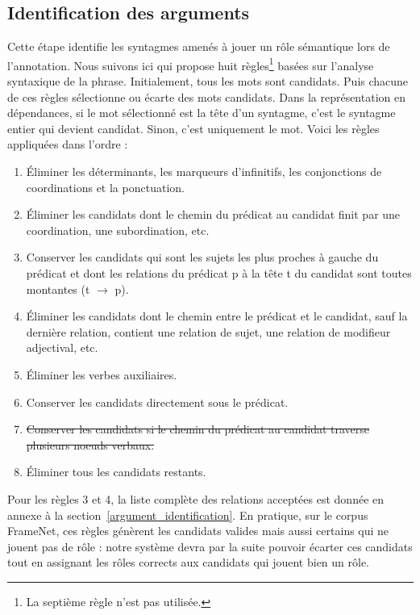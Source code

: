 \subsection{Identification des arguments}


Cette étape identifie les syntagmes amenés à jouer un rôle sémantique lors de
l'annotation. Nous suivons ici \cite{lang2011unsupervised} qui propose huit
règles\footnote{La septième règle n'est pas utilisée.} basées sur l'analyse
syntaxique de la phrase. Initialement, tous les mots sont candidats. Puis
chacune de ces règles sélectionne ou écarte des mots candidats. Dans la
représentation en dépendances, si le mot sélectionné est la tête d'un syntagme,
c'est le syntagme entier qui devient candidat. Sinon, c'est uniquement le mot.
Voici les règles appliquées dans l'ordre :

\begin{enumerate}
    \item Éliminer les déterminants, les marqueurs d'infinitifs, les conjonctions de coordinations et la ponctuation.
    \item Éliminer les candidats dont le chemin du prédicat au candidat finit par une coordination, une subordination, etc.
    \item Conserver les candidats qui sont les sujets les plus proches à gauche du prédicat et dont les relations du prédicat p à la tête t du candidat sont toutes montantes (t $\rightarrow$ p).
    \item Éliminer les candidats  dont le chemin entre le prédicat et le candidat, sauf la dernière relation, contient une relation de sujet, une relation de modifieur adjectival, etc.
    \item Éliminer les verbes auxiliaires.
    \item Conserver les candidats directement sous le prédicat.
    \item \sout{Conserver les candidats si le chemin du prédicat au candidat traverse plusieurs noeuds verbaux.}
    \item Éliminer tous les candidats restants.
\end{enumerate}

Pour les règles 3 et 4, la liste complète des relations acceptées est donnée en
annexe à la section~\ref{argument_identification}. En pratique, sur le corpus
FrameNet, ces règles génèrent les candidats valides mais aussi certains qui ne
jouent pas de rôle : notre système devra par la suite pouvoir écarter ces
candidats tout en assignant les rôles corrects aux candidats qui jouent bien un
rôle.

